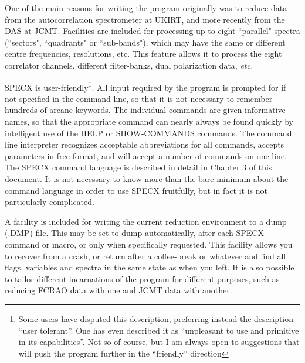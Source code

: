 \documentclass[11pt,twoside]{report}
\newcommand{\etc}{{\it etc.\,}}
\begin{document}
One of the main reasons for writing the program originally was to
reduce data from the autocorrelation spectrometer at
UKIRT, and more recently from the DAS at JCMT. Facilities are included
for processing up to eight ``parallel" spectra
(``sectors", ``quadrants" or
``sub-bands"), which may have the same or different
centre frequencies, resolutions, etc. This feature allows it to
process the eight correlator channels, different
filter-banks, dual polarization  data, \etc

SPECX is user-friendly\footnote{Some users have disputed this
description, preferring instead the description ``user tolerant''. One
has even described it as ``unpleasant to use and primitive in its
capabilities''. Not so of course, but I am always open to suggestions
that will push the program further in the ``friendly'' direction}. All
input required by the program is prompted for if not specified in the
command line, so that it is not necessary to remember hundreds of
arcane keywords. The individual commands are given informative names,
so that the appropriate command can nearly always be found quickly by
intelligent use of the HELP or SHOW-COMMANDS commands. The command
line interpreter recognizes acceptable abbreviations for all commands,
accepts parameters in free-format, and will accept a number of
commands on one line. The SPECX command language is described in
detail in Chapter 3 of this document. It is not necessary to know more
than the bare minimum about the command language in order to use SPECX
fruitfully, but in fact it is not particularly complicated.

A facility is included for writing the current reduction
environment to a dump (.DMP) file. This may be set
to dump automatically, after each SPECX command or macro, or only when
specifically requested. This facility allows you to recover from a
crash, or return after a coffee-break or whatever
and find all flags, variables and spectra in the same state as when
you left. It is also possible to tailor different incarnations of the
program for different purposes, such as reducing FCRAO data with one
and JCMT data with another.
\end{document}

